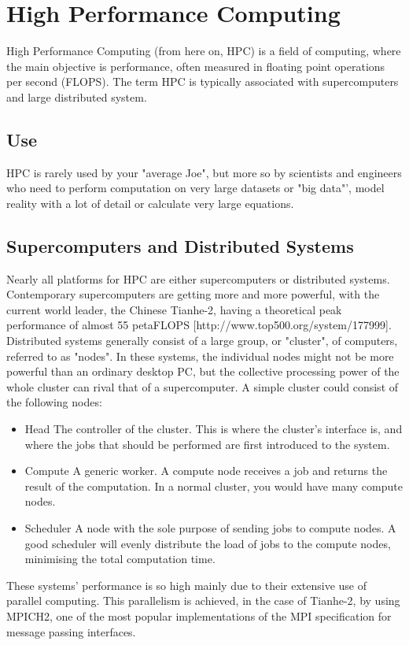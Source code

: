\chapter{High Performance Computing}
High Performance Computing (from here on, HPC) is a field of computing, where the main objective is performance, often measured in floating point operations per second (FLOPS). The term HPC is typically associated with supercomputers and large distributed system.

\section{Use}
HPC is rarely used by your "average Joe", but more so by scientists and engineers who need to perform computation on very large datasets or "big data"', model reality with a lot of detail or calculate very large equations.

\section{Supercomputers and Distributed Systems}
Nearly all platforms for HPC are either supercomputers or distributed systems. Contemporary supercomputers are getting more and more powerful, with the current world leader, the Chinese Tianhe-2, having a theoretical peak performance of almost 55 petaFLOPS [http://www.top500.org/system/177999]. 
Distributed systems generally consist of a large group, or "cluster", of computers, referred to as "nodes". In these systems, the individual nodes might not be more powerful than an ordinary desktop PC, but the collective processing power of the whole cluster can rival that of a supercomputer. 
A simple cluster could consist of the following nodes:
\begin{itemize}
	\item Head
	The controller of the cluster. This is where the cluster's interface is, and where the jobs that should be performed are first introduced to the system.
	\item Compute
	A generic worker. A compute node receives a job and returns the result of the computation. In a normal cluster, you would have many compute nodes.
	\item Scheduler
	A node with the sole purpose of sending jobs to compute nodes. A good scheduler will evenly distribute the load of jobs to the compute nodes, minimising the total computation time.
\end{itemize}

These systems' performance is so high mainly due to their extensive use of parallel computing. This parallelism is achieved, in the case of Tianhe-2, by using MPICH2, one of the most popular implementations of the MPI specification for message passing interfaces.

